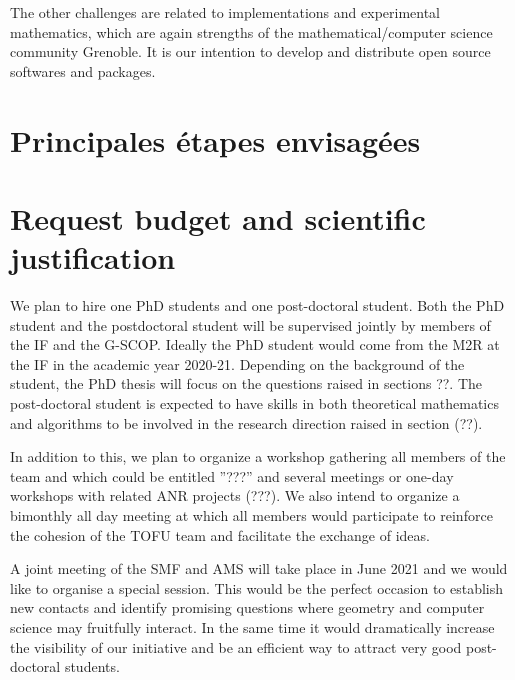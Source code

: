 \documentclass[14pt,fleqn]{article}
\begin{document}
The other challenges are related to implementations and experimental mathematics, 
which are again strengths of the 
mathematical/computer science community Grenoble. 
It is our intention to develop and distribute open source softwares and packages.

\section{Principales étapes envisagées}


\section{ Request budget and scientific justification}

We plan to hire one PhD students and one post-doctoral student. 
Both the PhD student
and the postdoctoral student
will be supervised jointly 
by members of the IF and the G-SCOP.
Ideally the PhD student would
come from the M2R at the IF 
in the academic year 2020-21.
Depending on the background of the student, the PhD thesis will focus on the
questions raised in sections ??.
The post-doctoral student is expected to have skills in both
theoretical mathematics 
and algorithms
to be involved in the research direction raised in section (??).

In addition to this, we plan to organize a workshop gathering all members of the
team and which could be entitled ”???” and several meetings
or one-day workshops with related ANR projects (???).
We also intend to organize 
a bimonthly all day meeting 
at which all members would participate
to reinforce the cohesion of the TOFU team
and facilitate the exchange of ideas.

A joint meeting of the SMF and AMS
will take place in June 2021
and we would like to organise a
special session.
This would be the perfect occasion to establish new contacts and identify promising questions where
geometry and computer science may fruitfully interact. In the same time it would dramatically
increase the visibility of our initiative and be an efficient way to attract very good post-doctoral
students.

\vspace{.5in}
 
\end{document}
